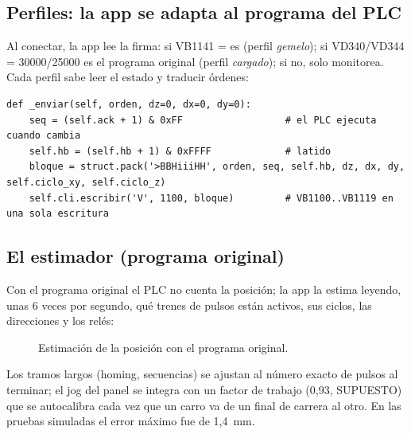 \documentclass[a4paper,11pt]{article}
\begin{document}
\subsection{Perfiles: la app se adapta al programa del PLC}
Al conectar, la app lee la firma: si VB1141 =  es  (perfil \emph{gemelo}); si VD340/VD344 = 30000/25000 es el programa original (perfil \emph{cargado}); si no, solo monitorea. Cada perfil sabe leer el estado y traducir órdenes:

\begin{lstlisting}[style=py, caption={Envío de una orden al buzón del programa del gemelo (\texttt{brazo.py}).}]
def _enviar(self, orden, dz=0, dx=0, dy=0):
    seq = (self.ack + 1) & 0xFF                  # el PLC ejecuta cuando cambia
    self.hb = (self.hb + 1) & 0xFFFF             # latido
    bloque = struct.pack('>BBHiiiHH', orden, seq, self.hb, dz, dx, dy, self.ciclo_xy, self.ciclo_z)
    self.cli.escribir('V', 1100, bloque)         # VB1100..VB1119 en una sola escritura
\end{lstlisting}

\subsection{El estimador (programa original)}\label{sec:estimador}
Con el programa original el PLC no cuenta la posición; la app la estima leyendo, unas 6 veces por segundo, qué trenes de pulsos están activos, sus ciclos, las direcciones y los relés:

\begin{figure}[H]
\centering
{}
\caption{Estimación de la posición con el programa original.}
\end{figure}
Los tramos largos (homing, secuencias) se ajustan al número exacto de pulsos al terminar; el jog del panel se integra con un factor de trabajo (0,93, SUPUESTO) que se autocalibra cada vez que un carro va de un final de carrera al otro. En las pruebas simuladas el error máximo fue de 1,4~mm.
\end{document}

